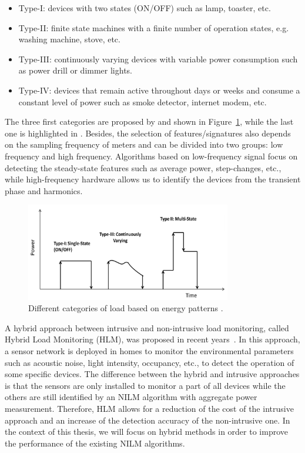 \begin{itemize}
\item Type-I: devices with two states (ON/OFF) such as lamp, toaster, etc.
\item Type-II: finite state machines with a finite number of operation states, e.g. washing machine, stove, etc.
\item Type-III: continuously varying devices with variable power consumption such as power drill or dimmer lights.
\item Type-IV: devices that remain active throughout days or weeks and consume a constant level of power such as smoke detector, internet modem, etc.
\end{itemize}
The three first categories are proposed by \cite{Hart92} and shown in Figure~\ref{fig:I4}, while the last one is highlighted in \cite{Zeifman11TCE,Baranski03}. Besides, the selection of features/signatures also depends on the sampling frequency of meters and can be divided into two groups: low frequency  and high frequency.
Algorithms based on low-frequency signal focus on detecting the steady-state features such as average power, step-changes, etc., while high-frequency hardware allows us to identify the devices from the transient phase and harmonics.
\begin{figure}
\centering
\includegraphics[width=0.8\textwidth]{./chapters/chapter1/images/load_categories.pdf} 
\caption{Different categories of load based on energy patterns \cite{Zoha12}.} 
\label{fig:I4} 
\end{figure}

A hybrid approach between intrusive and non-intrusive load monitoring, called Hybrid Load Monitoring (HLM), was proposed in recent years~\cite{TangW16,Berges10,Berges11,Guvensan13,Uddin12}. In this approach, a sensor network is deployed in homes to monitor the environmental parameters such as acoustic noise, light intensity, occupancy, etc., to detect the operation of some specific devices. The difference between the hybrid and intrusive approaches is that the sensors are only installed to monitor a part of all devices while the others are still identified by an NILM algorithm with aggregate power measurement. Therefore, HLM allows for a reduction of the cost of the intrusive approach and an increase of the detection accuracy of the non-intrusive one. In the context of this thesis, we will focus on hybrid methods in order to improve the performance of the existing NILM algorithms.


